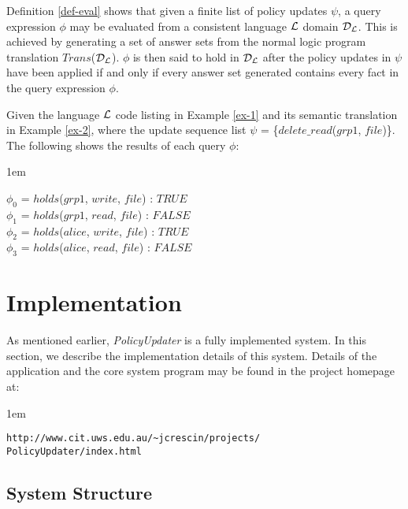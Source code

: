 \documentclass[global,twocolumn,final]{svjour}
\newenvironment{vexample}
  {\begin{example}\hspace{0.25em}}
  {\end{example}}
\newenvironment{vquote}
  {\begin{list}{}{\leftmargin 1em}\item[]}
  {\end{list}}
\begin{document}
    Definition \ref{def-eval} shows that given a finite list of policy updates
    $\psi$, a query expression $\phi$ may be evaluated from a consistent
    language ${\cal L}$ domain ${\cal D_{L}}$. This is achieved by generating a
    set of answer sets from the normal logic program translation
    $Trans$(${\cal D_{L}}$). $\phi$ is then said to hold in ${\cal D_{L}}$
    after the policy updates in $\psi$ have been applied if and only if every
    answer set generated contains every fact in the query expression $\phi$.

    \begin{vexample}
      \label{ex-3}
      Given the language ${\cal L}$ code listing in Example \ref{ex-1} and its
      semantic translation in Example \ref{ex-2}, where the update sequence
      list $\psi$ = \{$delete\_read$($grp1$, $file$)\}. The following shows the
      results of each query $\phi$:

      \begin{vquote}
        $\phi_{0}$ = $holds$($grp1$, $write$, $file$) : $TRUE$ \\
        $\phi_{1}$ = $holds$($grp1$, $read$, $file$) : $FALSE$ \\
        $\phi_{2}$ = $holds$($alice$, $write$, $file$) : $TRUE$ \\
        $\phi_{3}$ = $holds$($alice$, $read$, $file$) : $FALSE$
      \end{vquote}
    \end{vexample}

  \section{Implementation}
    \label{sec-implement}

    As mentioned earlier, {\em PolicyUpdater} is a fully implemented system.
    In this section, we describe the implementation details of this system.
    Details of the application and the core system program may be found in
    the project homepage at:

    \begin{vquote}
      {\tt\scriptsize http://www.cit.uws.edu.au/\~{}jcrescin/projects/} \\
      {\tt\scriptsize PolicyUpdater/index.html}
    \end{vquote}

    \subsection{System Structure}
\end{document}
